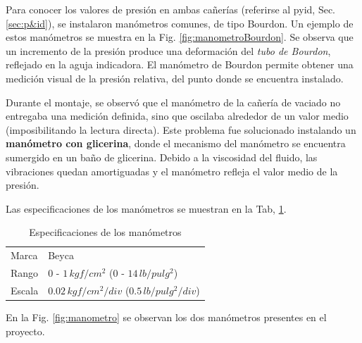 Para conocer los valores de presión en ambas cañerías
(referirse al \gls{pyid}, Sec. \ref{sec:p&id}),
se instalaron manómetros comunes, de tipo Bourdon.
Un ejemplo de estos manómetros se muestra en la Fig. \ref{fig:manometroBourdon}.
Se observa que un incremento de la presión produce una deformación
del \emph{tubo de Bourdon}, reflejado en la aguja indicadora.
El manómetro de Bourdon permite obtener una medición visual de la
presión relativa, del punto donde se encuentra instalado.

Durante el montaje, se observó que el manómetro de la cañería de vaciado
no entregaba una medición definida, sino que oscilaba alrededor de un
valor medio (imposibilitando la lectura directa).
Este problema fue solucionado instalando un \textbf{manómetro con glicerina},
donde el mecanismo del manómetro se encuentra sumergido en un baño de glicerina.
Debido a la viscosidad del fluido, las vibraciones quedan amortiguadas
y el manómetro refleja el valor medio de la presión.

Las especificaciones de los manómetros se muestran en la Tab,
\ref{tab:EspManoms}.

\begin{table}[ht]
\renewcommand{\arraystretch}{1.3}
\centering
\begin{tabular}{|l|l|}
\hline
Marca & Beyca\\
Rango & $0$ - $1\,kgf/cm^2$ ($0$ - $14\,lb/pulg^2$)\\
Escala & $0.02\,kgf/cm^2/div$ ($0.5\,lb/pulg^2/div$)\\
\hline
\end{tabular}
\caption{Especificaciones de los manómetros}
\label{tab:EspManoms}
\end{table}

En la Fig. \ref{fig:manometro} se observan los dos manómetros
presentes en el proyecto.

